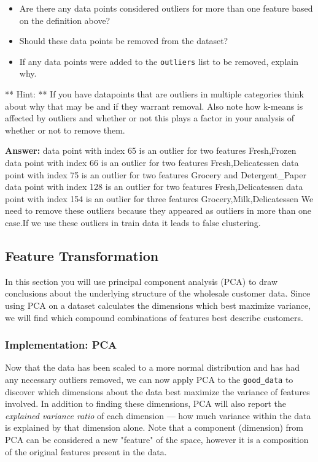\documentclass[11pt]{article}
\providecommand{\tightlist}{%
      \setlength{\itemsep}{0pt}\setlength{\parskip}{0pt}}
\begin{document}
\begin{itemize}
\tightlist
\item
  Are there any data points considered outliers for more than one
  feature based on the definition above?
\item
  Should these data points be removed from the dataset?
\item
  If any data points were added to the \texttt{outliers} list to be
  removed, explain why.
\end{itemize}

** Hint: ** If you have datapoints that are outliers in multiple
categories think about why that may be and if they warrant removal. Also
note how k-means is affected by outliers and whether or not this plays a
factor in your analysis of whether or not to remove them.

    \textbf{Answer:} data point with index 65 is an outlier for two features
Fresh,Frozen data point with index 66 is an outlier for two features
Fresh,Delicatessen data point with index 75 is an outlier for two
features Grocery and Detergent\_Paper data point with index 128 is an
outlier for two features Fresh,Delicatessen data point with index 154 is
an outlier for three features Grocery,Milk,Delicatessen We need to
remove these outliers because they appeared as outliers in more than one
case.If we use these outliers in train data it leads to false
clustering.

    \subsection{Feature Transformation}\label{feature-transformation}

In this section you will use principal component analysis (PCA) to draw
conclusions about the underlying structure of the wholesale customer
data. Since using PCA on a dataset calculates the dimensions which best
maximize variance, we will find which compound combinations of features
best describe customers.

    \subsubsection{Implementation: PCA}\label{implementation-pca}

Now that the data has been scaled to a more normal distribution and has
had any necessary outliers removed, we can now apply PCA to the
\texttt{good\_data} to discover which dimensions about the data best
maximize the variance of features involved. In addition to finding these
dimensions, PCA will also report the \emph{explained variance ratio} of
each dimension --- how much variance within the data is explained by
that dimension alone. Note that a component (dimension) from PCA can be
considered a new "feature" of the space, however it is a composition of
the original features present in the data.
\end{document}

